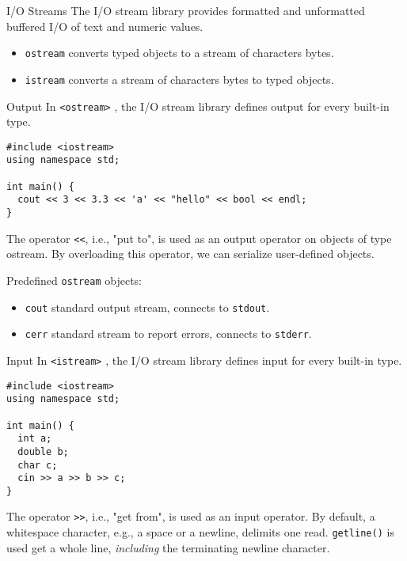 \documentclass[presentation]{beamer}
\begin{document}
\begin{frame}[fragile,label={sec:orgheadline65}]{I/O Streams}
 The I/O stream library provides formatted and unformatted buffered
I/O of text and numeric values.

\begin{itemize}
\item \texttt{ostream} converts typed objects to a stream of characters bytes.
\item \texttt{istream} converts a stream of characters bytes to typed objects.
\end{itemize}
\end{frame}

\begin{frame}[fragile,label={sec:orgheadline66}]{Output}
 In \texttt{<ostream>} , the I/O stream library defines output for every
built-in type.

\begin{verbatim}
#include <iostream>
using namespace std;

int main() {
  cout << 3 << 3.3 << 'a' << "hello" << bool << endl;
}
\end{verbatim}

The operator \texttt{<<}, i.e., "put to", is used as an output operator on
objects of type ostream.  By overloading this operator, we can
serialize user-defined objects.

Predefined \texttt{ostream} objects:
\begin{itemize}
\item \texttt{cout} standard output stream, connects to \texttt{stdout}.
\item \texttt{cerr} standard stream to report errors, connects to \texttt{stderr}.
\end{itemize}
\end{frame}

\begin{frame}[fragile,label={sec:orgheadline67}]{Input}
 In \texttt{<istream>} , the I/O stream library defines input for every
built-in type.

\begin{verbatim}
#include <iostream>
using namespace std;

int main() {
  int a;
  double b;
  char c;
  cin >> a >> b >> c;
}
\end{verbatim}

The operator \texttt{>>}, i.e., "get from", is used as an input operator.
By default, a whitespace character, e.g., a space or a newline,
delimits one read.  \texttt{getline()} is used get a whole line,
\emph{including} the terminating newline character.
\end{frame}
\end{document}
